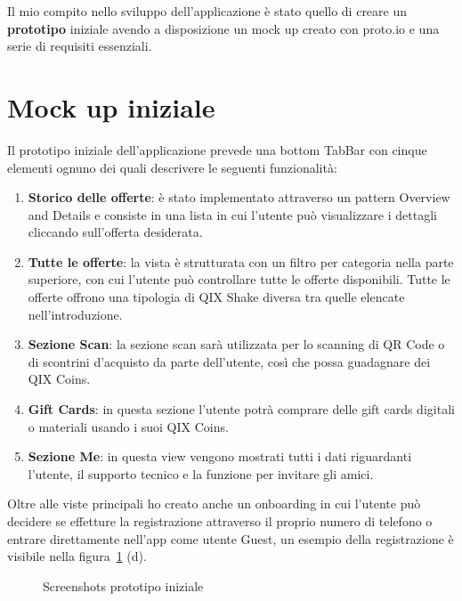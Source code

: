 
Il mio compito nello sviluppo dell'applicazione è stato quello 
di creare un \textbf{prototipo} iniziale avendo a disposizione un mock up creato con
proto.io\cite{protoio} e una serie di requisiti essenziali.

\section{Mock up iniziale}

Il prototipo iniziale dell'applicazione prevede una
bottom TabBar con cinque elementi ognuno dei quali
descrivere le seguenti funzionalità:

\begin{enumerate}
    \item \textbf{Storico delle offerte}: è stato implementato attraverso un pattern Overview and Details
    e consiste in una lista in cui l'utente può visualizzare i dettagli cliccando sull'offerta desiderata.
    \item \textbf{Tutte le offerte}: la vista è strutturata con un filtro per categoria nella parte superiore,
    con cui l'utente può controllare tutte le offerte disponibili. Tutte le offerte offrono una tipologia di QIX Shake diversa tra quelle elencate nell'introduzione.
    \item \textbf{Sezione Scan}: la sezione scan sarà utilizzata per lo scanning di QR Code o di scontrini d'acquisto da parte dell'utente,
    così che possa guadagnare dei QIX Coins.
    \item \textbf{Gift Cards}: in questa sezione l'utente potrà comprare delle gift cards digitali o materiali usando i suoi QIX Coins.
    \item \textbf{Sezione Me}: in questa view vengono mostrati tutti i dati riguardanti l'utente, il supporto tecnico
    e la funzione per invitare gli amici.
\end{enumerate}

Oltre alle viste principali ho creato anche un onboarding in cui l'utente può decidere se effetture la registrazione
attraverso il proprio numero di telefono o entrare direttamente nell'app come utente Guest, un esempio della registrazione è
visibile nella figura~\ref{fig:screenshots} (d).

\begin{figure}
    \hfill
    \hfill
    \hfill
    \hfill
    \hfill
    \caption{Screenshots prototipo iniziale}\label{fig:screenshots}
\end{figure}

